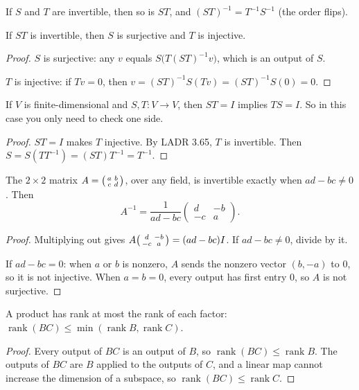 \documentclass[11pt]{scrartcl}
\begin{document}
\begin{proposition*}[LADR 3D]
  If $S$ and $T$ are invertible, then so is $ST$, and $(ST)^{-1}=T^{-1}S^{-1}$ (the order flips).

  If $ST$ is invertible, then $S$ is surjective and $T$ is injective.
\end{proposition*}
\begin{proof}
  $S$ is surjective: any $v$ equals $S\big(T(ST)^{-1}v\big)$, which is an output of $S$.

  $T$ is injective: if $Tv=0$, then $v=(ST)^{-1}S(Tv)=(ST)^{-1}S(0)=0$.
\end{proof}

\begin{corollary*}[Prop.~33]
  If $V$ is finite-dimensional and $S,T\colon V\to V$, then $ST=I$ implies $TS=I$.
  So in this case you only need to check one side.
\end{corollary*}
\begin{proof}
  $ST=I$ makes $T$ injective. By LADR 3.65, $T$ is invertible. Then $S=S(TT^{-1})=(ST)T^{-1}=T^{-1}$.
\end{proof}

\begin{proposition*}[HW4 P1]
  The $2\times2$ matrix $A=\begin{psmallmatrix}a&b\\c&d\end{psmallmatrix}$, over any field, is invertible exactly when $ad-bc\ne0$. Then
  \[ A^{-1}=\frac{1}{ad-bc}\begin{pmatrix}d&-b\\-c&a\end{pmatrix}. \]
\end{proposition*}
\begin{proof}
  Multiplying out gives $A\begin{psmallmatrix}d&-b\\-c&a\end{psmallmatrix}=(ad-bc)I$. If $ad-bc\ne0$, divide by it.

  If $ad-bc=0$: when $a$ or $b$ is nonzero, $A$ sends the nonzero vector $(b,-a)$ to $0$, so it is not injective. When $a=b=0$, every output has first entry $0$, so $A$ is not surjective.
\end{proof}

\begin{proposition*}[HW4 P4]
  A product has rank at most the rank of each factor: $\operatorname{rank}(BC)\le\min(\operatorname{rank}B,\operatorname{rank}C)$.
\end{proposition*}
\begin{proof}
  Every output of $BC$ is an output of $B$, so $\operatorname{rank}(BC)\le\operatorname{rank}B$.
  The outputs of $BC$ are $B$ applied to the outputs of $C$, and a linear map cannot increase the dimension of a subspace, so $\operatorname{rank}(BC)\le\operatorname{rank}C$.
\end{proof}
\end{document}
